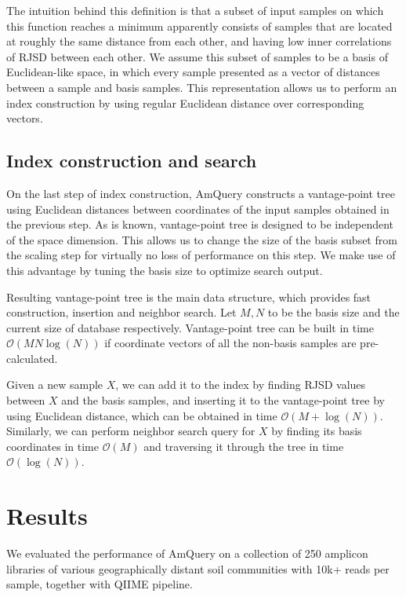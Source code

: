 \documentclass[10pt,letterpaper]{article}
\begin{document}
	The intuition behind this definition is that a subset of input samples on 
	which this function reaches a minimum apparently consists of samples 
	that are located at roughly the same distance from each other, and having low 
	inner correlations of RJSD between each other.
	We assume this subset of samples to be a basis of Euclidean-like
	space, in which every sample presented as a vector of distances between a sample
	and basis samples. This representation allows us to perform an index 
	construction by using regular Euclidean distance over corresponding
	vectors.

	\subsection*{Index construction and search}
	On the last step of index construction, AmQuery constructs a vantage-point
	tree using Euclidean distances between coordinates of the input samples 
	obtained in the previous step. As is known, vantage-point tree is 
	designed to be independent of the space dimension. This allows us to
	change the size of the basis subset from the scaling step for virtually 
	no loss of performance on this step. We make use of this advantage by tuning
	the basis size to optimize search output.

	Resulting vantage-point tree is the main data structure, which provides
	fast construction, insertion and neighbor search. Let $M, N$ to be the basis size
	and the current size of database respectively. Vantage-point tree can 
	be built in time $\mathcal{O}(MN\log(N))$ if coordinate vectors of all 
	the non-basis samples are pre-calculated.
	
	Given a new sample $X$, we can add it 
	to the index by finding RJSD values between $X$ and the basis samples, and
	inserting it to the vantage-point tree by using Euclidean distance, which
	can be obtained in time $\mathcal{O}(M + \log(N))$. Similarly, we can perform neighbor
	search query for $X$ by finding its basis coordinates in time 
	$\mathcal{O}(M)$ and traversing it through the tree in time $\mathcal{O}(\log(N))$.


	\section*{Results}
	We evaluated the performance of AmQuery on a collection of 250 amplicon 
	libraries of various geographically distant soil communities 
	with 10k+ reads per sample, together with QIIME pipeline.
\end{document}

